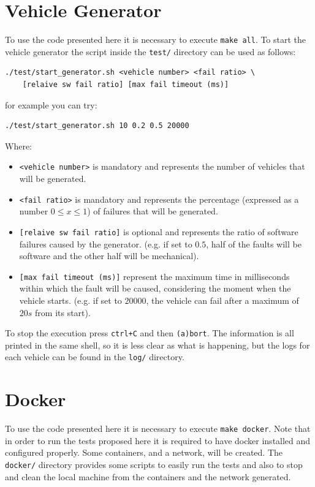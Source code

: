 \documentclass{memoir}
\begin{document}
\section{Vehicle Generator}
To use the code presented here it is necessary to execute \texttt{make all}. To start the vehicle generator the script inside the \texttt{test/} directory can be used as follows:
\begin{verbatim}
./test/start_generator.sh <vehicle number> <fail ratio> \
	[relaive sw fail ratio] [max fail timeout (ms)]
\end{verbatim}
for example you can try:
\begin{verbatim}
./test/start_generator.sh 10 0.2 0.5 20000
\end{verbatim}
Where:
\begin{itemize}
	\item \verb|<vehicle number>| is mandatory and represents the number of vehicles that will be generated.
	\item \verb|<fail ratio>| is mandatory and represents the percentage (expressed as a number $0 \le x \le 1$) of failures that will be generated.
	\item \verb|[relaive sw fail ratio]| is optional and represents the ratio of software failures caused by the generator. (e.g. if set to $0.5$, half of the faults will be software and the other half will be mechanical).
	\item \verb|[max fail timeout (ms)]| represent the maximum time in milliseconds within which the fault will be caused, considering the moment when the vehicle starts. (e.g. if set to $20000$, the vehicle can fail after a maximum of $20s$ from its start).
\end{itemize}
To stop the execution press \verb|ctrl+C| and then \verb|(a)bort|. The information is all printed in the same shell, so it is less clear as what is happening, but the logs for each vehicle can be found in the \verb|log/| directory.

\section{Docker}
To use the code presented here it is necessary to execute \texttt{make docker}. Note that in order to run the tests proposed here it is required to have docker installed and configured properly. Some containers, and a network, will be created. The \verb|docker/| directory provides some scripts to easily run the tests and also to stop and clean the local machine from the containers and the network generated.
\end{document}
